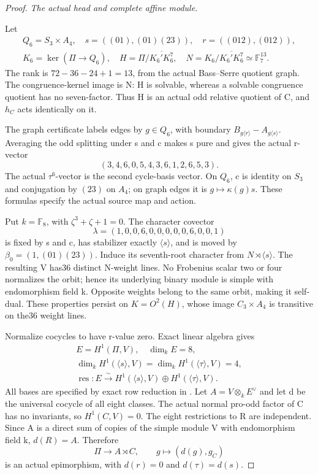 \begin{proof}
\emph{The actual head and complete affine module.}\par
Let
\[
 \begin{gathered}
 Q_6=S_3\times A_4,\quad
 s=((01),(01)(23)),\quad r=((012),(012)),\\
 K_6=\ker(\Pi\to Q_6),\quad
 H=\Pi/\overline{K_6'K_6^7},\quad
 N=K_6/\overline{K_6'K_6^7}\simeq\mathbb F_7^{13}.
 \end{gathered}\tag{A.56.2}
\]
The rank is \(72-36-24+1=13\), from the actual Bass--Serre
quotient graph. The congruence-kernel image is N: H is solvable,
whereas a solvable congruence quotient has no seven-factor.
Thus H is an actual odd relative quotient of C, and \(h_C\)
acts identically on it.

The graph certificate labels edges by \(g\in Q_6\), with boundary
\(B_{g\langle r\rangle}-A_{g\langle s\rangle}\).
Averaging the odd splitting under s and c makes s pure and gives
the actual r-vector
\[
 (3,4,6,0,5,4,3,6,1,2,6,5,3).\tag{A.56.3}
\]
The actual \(\tau^6\)-vector is the second cycle-basis vector.
On \(Q_6\), c is identity on \(S_3\) and conjugation by \((23)\)
on \(A_4\); on graph edges it is \(g\mapsto\kappa(g)s\).
These formulas specify the actual source map and action.

Put \(k=\mathbb F_8\), with \(\zeta^3+\zeta+1=0\).
The character covector
\[
 \lambda=(1,0,0,6,0,0,0,0,0,6,0,0,1)\tag{A.56.4}
\]
is fixed by s and c, has stabilizer exactly \(\langle s\rangle\),
and is moved by \(\beta_0=(1,(01)(23))\). Induce its seventh-root
character from \(N\rtimes\langle s\rangle\). The resulting V
has36 distinct N-weight lines. No Frobenius scalar two or four
normalizes the orbit; hence its underlying binary module is simple
with endomorphism field k. Opposite weights belong to the same
orbit, making it self-dual. These properties persist on
\(K=O^2(H)\), whose image \(C_3\times A_4\) is transitive on
the36 weight lines.

Normalize cocycles to have r-value zero. Exact linear algebra gives
\[
 \begin{gathered}
 E=H^1(\Pi,V),\quad\dim_kE=8,\\
 \dim_kH^1(\langle s\rangle,V)
 =\dim_kH^1(\langle\tau\rangle,V)=4,\\
 \operatorname{res}:E\xrightarrow{\sim}
 H^1(\langle s\rangle,V)\oplus H^1(\langle\tau\rangle,V).
 \end{gathered}\tag{A.56.5}
\]
All bases are specified by exact row reduction in
. Let \(A=V\otimes_kE^\vee\)
and let d be the universal cocycle of all eight classes. The actual
normal pro-odd factor of C has no invariants, so \(H^1(C,V)=0\).
The eight restrictions to R are independent. Since A is a direct
sum of copies of the simple module V with endomorphism field k,
\(d(R)=A\). Therefore
\[
 \Pi\to A\rtimes C,\qquad g\mapsto(d(g),g_C)\tag{A.56.6}
\]
is an actual epimorphism, with \(d(r)=0\) and \(d(\tau)=d(s)\).


\end{proof}
